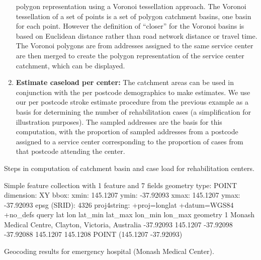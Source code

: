 \documentclass[utf8]{frontiersHLTH}
\begin{document}
\begin{table}[h]
\begin{center}
\begin{mdframed}[backgroundcolor=blue!20]
\begin{enumerate}
  polygon representation using a Voronoi tessellation approach. The
  Voronoi tessellation of a set of points is a set of polygon catchment
  basins, one basin for each point. However the definition of ``closer''
  for the Voronoi basins is based on Euclidean distance rather than road
  network distance or travel time. The Voronoi polygons are from
  addresses assigned to the same service center are then merged to
  create the polygon representation of the service center catchment,
  which can be displayed.
\item
  {\bf Estimate caseload per center:} The catchment areas can be used in
  conjunction with the per postcode demographics to make estimates. We
  use our per postcode stroke estimate procedure from the previous
  example as a basis for determining the number of rehabilitation cases
  (a simplification for illustration purposes). The sampled addresses
  are the basis for this computation, with the proportion of sampled
  addresses from a postcode assigned to a service center corresponding
  to the proportion of cases from that postcode attending the center.
\end{enumerate}
\end{mdframed}
\end{center}
\caption{Steps in computation of catchment basin and case load for
  rehabilitation centers. \label{tab:exampleB}}
\end{table}

\begin{table}[h]
\small
\begin{verbnobox}[\fontsize{6pt}{6pt}\selectfont]
Simple feature collection with 1 feature and 7 fields
geometry type:  POINT
dimension:      XY
bbox:           xmin: 145.1207 ymin: -37.92093 xmax: 145.1207 ymax: -37.92093
epsg (SRID):    4326
proj4string:    +proj=longlat +datum=WGS84 +no_defs
                                                query       lat      lon   lat_min   lat_max  lon_min  lon_max                   geometry
1 Monash Medical Centre, Clayton, Victoria, Australia -37.92093 145.1207 -37.92098 -37.92088 145.1207 145.1208 POINT (145.1207 -37.92093)
\end{verbnobox}
\normalsize
\caption{Geocoding results for emergency hospital (Monash Medical Center).\label{tab:GeocodeMMC}}
\end{table}
\end{document}
